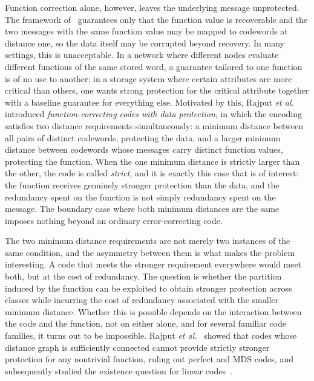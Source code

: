 \documentclass[11pt,draftclsnofoot,journal,onecolumn]{IEEEtran}
\begin{document}
    Function correction alone, however, leaves the underlying message unprotected. The framework of~\cite{10132545} guarantees only that the function value is recoverable and the two messages with the same function value may be mapped to codewords at distance one, so the data itself may be corrupted beyond recovery. In many settings, this is unacceptable. In a network where different nodes evaluate different functions of the same stored word, a guarantee tailored to one function is of no use to another; in a storage system where certain attributes are more critical than others, one wants strong protection for the critical attribute together with a baseline guarantee for everything else. Motivated by this, Rajput \emph{et al.}~\cite{rajput2025function} introduced \emph{function-correcting codes with data protection}, in which the encoding satisfies two distance requirements simultaneously: a minimum distance between all pairs of distinct codewords, protecting the data, and a larger minimum distance between codewords whose messages carry distinct function values, protecting the function. When the one minimum distance is strictly larger than the other, the code is called \emph{strict}, and it is exactly this case that is of interest: the function receives genuinely stronger protection than the data, and the redundancy spent on the function is not simply redundancy spent on the message. The boundary case where both minimum distances are the same imposes nothing beyond an ordinary error-correcting code.

    
    The two minimum distance requirements are not merely two instances of the same condition, and the asymmetry between them is what makes the problem interesting. A code that meets the stronger requirement everywhere would meet both, but at the cost of redundancy. The question is whether the partition induced by the function can be exploited to obtain stronger protection across classes while incurring the cost of redundancy associated with the smaller minimum distance. Whether this is possible depends on the interaction between the code and the function, not on either alone, and for several familiar code families, it turns out to be impossible. Rajput \emph{et al.}~\cite{rajput2025function} showed that codes whose distance graph is sufficiently connected cannot provide strictly stronger protection for any nontrivial function, ruling out perfect and MDS codes, and subsequently studied the existence question for linear codes~\cite{existencerajput2026}.
\end{document}
